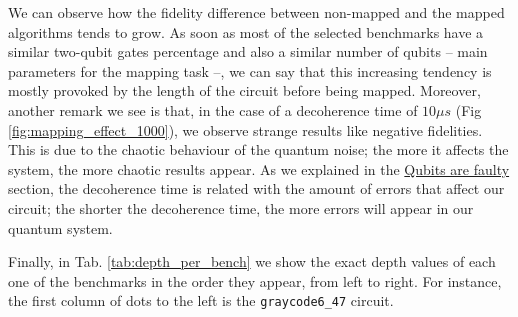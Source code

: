 We can observe how the fidelity difference between non-mapped and the mapped algorithms tends to grow.
As soon as most of the selected benchmarks have a similar two-qubit gates percentage and also a similar number of qubits -- main parameters for the mapping task --, we can say that this increasing tendency is mostly provoked by the length of the circuit before being mapped.
Moreover, another remark we see is that, in the case of a decoherence time of \(10 \mu s\) (Fig \ref{fig:mapping_effect_1000}), we observe strange results like negative fidelities. 
This is due to the chaotic behaviour of the quantum noise; the more it affects the system, the more chaotic results appear.
As we explained in the \href{quantum_computing.org}{Qubits are faulty} section, the decoherence time is related with the amount of errors that affect our circuit; the shorter the decoherence time, the more errors will appear in our quantum system.

Finally, in Tab. \ref{tab:depth_per_bench} we show the exact depth values of each one of the benchmarks in the order they appear, from left to right.
For instance, the first column of dots to the left is the \texttt{graycode6\_47} circuit.



